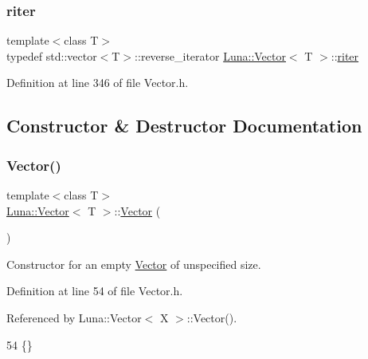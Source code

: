 \subsubsection{\texorpdfstring{riter}{riter}}
{\footnotesize\ttfamily template$<$class T$>$ \\
typedef std\+::vector$<$T$>$\+::reverse\+\_\+iterator \hyperlink{classLuna_1_1Vector}{Luna\+::\+Vector}$<$ T $>$\+::\hyperlink{classLuna_1_1Vector_a6db6c6b09df2c68bbfd1960c56bb20d5}{riter}}



Definition at line 346 of file Vector.\+h.



\subsection{Constructor \& Destructor Documentation}
\mbox{\label{classLuna_1_1Vector_a8dd08d46db516e9b06501f83fc01c22c}} 
\subsubsection{\texorpdfstring{Vector()}{Vector()}\hspace{0.1cm}{\footnotesize\ttfamily [1/5]}}
{\footnotesize\ttfamily template$<$class T$>$ \\
\hyperlink{classLuna_1_1Vector}{Luna\+::\+Vector}$<$ T $>$\+::\hyperlink{classLuna_1_1Vector}{Vector} (\begin{DoxyParamCaption}{ }\end{DoxyParamCaption})\hspace{0.3cm}{\ttfamily [inline]}}



Constructor for an empty \hyperlink{classLuna_1_1Vector}{Vector} of unspecified size. 



Definition at line 54 of file Vector.\+h.



Referenced by Luna\+::\+Vector$<$ X $>$\+::\+Vector().


\begin{DoxyCode}
54 \{\}
\end{DoxyCode}
\mbox{\label{classLuna_1_1Vector_a6f7d89a8dfbf7fd0543c843b897a6b05}} 
